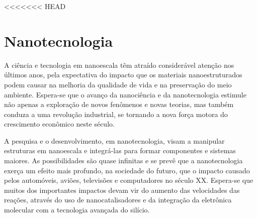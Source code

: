 \documentclass[10pt]{scrartcl}
\date{\today}
\title{}
\def\disciplina{Química}
\begin{document}
\twocolumn[

%




%

\smallbreak
\medbreak
\par\vspace{2ex}]%


<<<<<<< HEAD
\section{Nanotecnologia}
\label{sec:org02a6abd}
A ciência e tecnologia em nanoescala têm atraído considerável atenção nos últimos anos, pela expectativa do impacto que os materiais nanoestruturados podem causar na melhoria da qualidade de vida e na preservação do meio ambiente. Espera-se que o avanço da nanociência e da nanotecnologia estimule não apenas a exploração de novos fenômenos e novas teorias, mas também conduza a uma revolução industrial, se tornando a nova força motora do crescimento econômico neste século.

A pesquisa e o desenvolvimento, em nanotecnologia, visam a manipular estruturas em nanoescala e integrá-las para formar componentes e sistemas maiores. As possibilidades são quase infinitas e se prevê que a nanotecnologia exerça um efeito mais profundo, na sociedade do futuro, que o impacto causado pelos automóveis, aviões, televisões e computadores no século XX. Espera-se que muitos dos importantes impactos devam vir do aumento das velocidades das reações, através do uso de nanocatalisadores e da integração da eletrônica molecular com a tecnologia avançada do silício.
\end{document}
